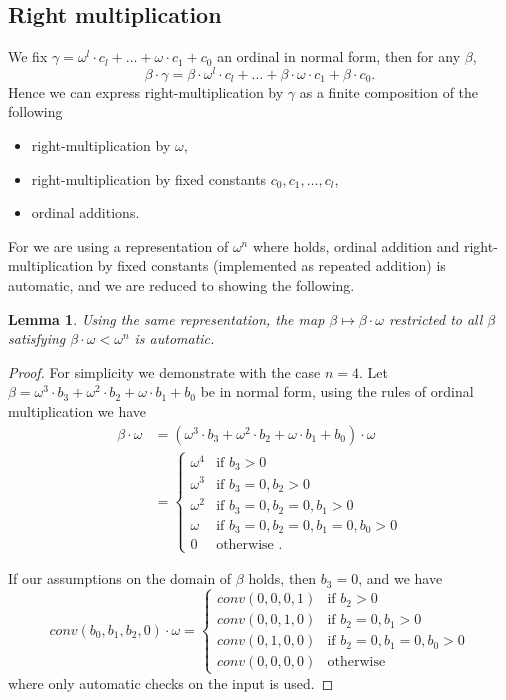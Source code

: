 \documentclass[british,a4paper,11pt,abstract=on]{scrreprt}
\newtheorem{lemma}[theorem]{Lemma}
\theoremstyle{definition}
\theoremstyle{remark}
\begin{document}
\subsection{Right multiplication}

We fix \(\gamma = \omega^l\cdot c_l + \dots + \omega\cdot c_1 + c_0\) an ordinal in normal form,
then for any \(\beta\),
\[ \beta\cdot\gamma = \beta\cdot\omega^l\cdot c_l + \dots + \beta\cdot\omega\cdot c_1 + \beta\cdot c_0. \]
Hence we can express right-multiplication by \(\gamma\) as a finite composition of the following
\begin{itemize}
    \item right-multiplication by \(\omega\),
    \item right-multiplication by fixed constants \(c_0, c_1,\dots, c_l\),
    \item ordinal additions.
\end{itemize}

For we are using a representation of \(\omega^n\) where  holds,
ordinal addition and right-multiplication by fixed constants (implemented as repeated addition) is automatic,
and we are reduced to showing the following.

\begin{lemma}
    Using the same representation, the map \(\beta \mapsto \beta\cdot\omega\)
    restricted to all \(\beta\) satisfying \(\beta\cdot\omega < \omega^n\) is automatic.
\end{lemma}
\begin{proof}
    For simplicity we demonstrate with the case \(n = 4\).
    Let \(\beta = \omega^3\cdot b_3 + \omega^2\cdot b_2 + \omega \cdot b_1 + b_0\) be in normal form,
    using the rules of ordinal multiplication we have
    \begin{align*}
        \beta\cdot\omega
        &= \left(\omega^3\cdot b_3 + \omega^2\cdot b_2 + \omega \cdot b_1 + b_0\right)\cdot\omega \\
        &= \begin{cases}
            \omega^4 &\text{if } b_3 > 0 \\
            \omega^3 &\text{if } b_3=0, b_2>0 \\
            \omega^2 &\text{if } b_3=0, b_2=0, b_1>0 \\
            \omega &\text{if } b_3=0, b_2=0, b_1=0, b_0>0 \\
            0 &\text{otherwise }.
        \end{cases}
    \end{align*}

    If our assumptions on the domain of \(\beta\) holds, then \(b_3 = 0\), and we have
    \[
        conv(b_0,b_1,b_2,0)\cdot\omega =
        \begin{cases}
            conv(0,0,0,1) &\text{if } b_2>0 \\
            conv(0,0,1,0) &\text{if } b_2=0, b_1>0 \\
            conv(0,1,0,0) &\text{if } b_2=0, b_1=0, b_0>0 \\
            conv(0,0,0,0) &\text{otherwise }
        \end{cases}
    \]
    where only automatic checks on the input is used.
\end{proof}
\end{document}
